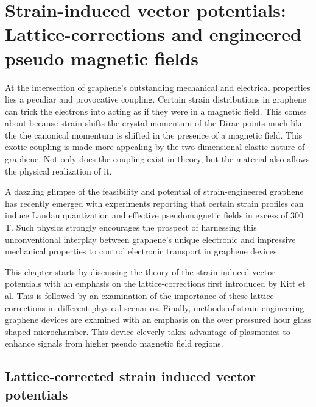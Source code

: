 \chapter{Strain-induced vector potentials: Lattice-corrections and engineered pseudo magnetic fields\label{chap:PVP}}

At the intersection of graphene's outstanding mechanical and electrical properties lies a peculiar and provocative coupling.
Certain strain distributions in graphene can trick the electrons into acting as if they were in a magnetic field.
This comes about because strain shifts the crystal momentum of the Dirac points much like the the canonical momentum is shifted in the presence of a magnetic field.
This exotic coupling is made more appealing by the two dimensional elastic nature of graphene.
Not only does the coupling exist in theory, but the material also allows the physical realization of it.

A dazzling glimpse of the feasibility and potential of strain-engineered graphene\cite{Pereira2009a,Guinea2009} has recently emerged with experiments reporting that certain strain profiles can induce Landau quantization and effective pseudomagnetic fields in excess of 300 T\cite{Levy2010,Yan2012,Yeh2011}.
Such physics strongly encourages the prospect of harnessing this unconventional interplay between graphene's unique electronic and impressive mechanical properties to control electronic transport in graphene devices\cite{Pereira2009a,Fogler2008}.

This chapter starts by discussing the theory of the strain-induced vector potentials with an emphasis on the lattice-corrections first introduced by Kitt et al\cite{Kitt2012,Kitt2013}.
This is followed by an examination of the importance of these lattice-corrections in different physical scenarios.
Finally, methods of strain engineering graphene devices are examined with an emphasis on the over pressured hour glass shaped microchamber.
This device cleverly takes advantage of plasmonics to enhance signals from higher pseudo magnetic field regions.

\section{Lattice-corrected strain induced vector potentials}

